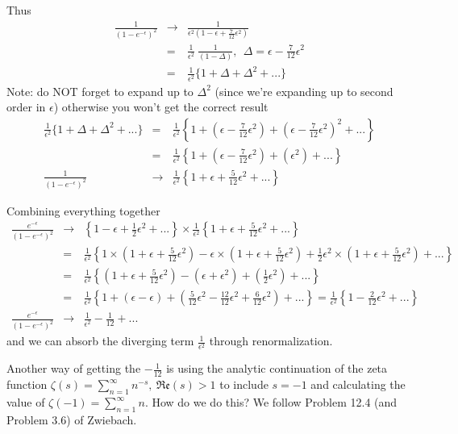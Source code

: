 \documentclass[aps,preprint,preprintnumbers,nofootinbib,showpacs,prd]{revtex4-1}
\newcommand{\nbea}{\begin{eqnarray*}}
\newcommand{\neea}{\end{eqnarray*}}
\begin{document}
Thus
%
\nbea
\frac{1}{(1-e^{-\epsilon})^2} & \rightarrow & \frac{1}{\epsilon^2(1 - \epsilon + \frac{7}{12}\epsilon^2)} \\
& = & \frac{1}{\epsilon^2} ~\frac{1}{(1 - \Delta)}, ~~\Delta = \epsilon - \frac{7}{12}\epsilon^2 \\
& = & \frac{1}{\epsilon^2} \{ 1 + \Delta + \Delta^2 + ... \}
\neea
%
Note: do NOT forget to expand up to $\Delta^2$ (since we're expanding up to second order in $\epsilon$) otherwise you won't get the correct result
%
\nbea
\frac{1}{\epsilon^2} \{ 1 + \Delta + \Delta^2 + ... \} & = & \frac{1}{\epsilon^2} \left \{ 1 + \left( \epsilon - \frac{7}{12}\epsilon^2 \right) + \left( \epsilon - \frac{7}{12}\epsilon^2 \right)^2 + ... \right \} \\
& = & \frac{1}{\epsilon^2} \left \{ 1 + \left( \epsilon - \frac{7}{12}\epsilon^2 \right) + \left( \epsilon^2 \right) + ... \right \} \\
\frac{1}{(1-e^{-\epsilon})^2} & \rightarrow & \frac{1}{\epsilon^2} \left \{ 1 + \epsilon + \frac{5}{12}\epsilon^2 + ... \right \} 
\neea
%

Combining everything together
%
\nbea
\frac{e^{-\epsilon}}{(1-e^{-\epsilon})^2} & \rightarrow & \left \{ 1 - \epsilon + \frac{1}{2} \epsilon^2 + ... \right \} \times \frac{1}{\epsilon^2} \left \{ 1 + \epsilon + \frac{5}{12}\epsilon^2 + ... \right \} \\
& = & \frac{1}{\epsilon^2} \left \{ 1 \times \left ( 1 + \epsilon + \frac{5}{12}\epsilon^2 \right ) - \epsilon \times \left ( 1 + \epsilon + \frac{5}{12}\epsilon^2 \right ) + \frac{1}{2}\epsilon^2 \times \left ( 1 + \epsilon + \frac{5}{12}\epsilon^2 \right ) + ... \right \} \\
& = & \frac{1}{\epsilon^2} \left \{ \left ( 1 + \epsilon + \frac{5}{12}\epsilon^2 \right ) - \left ( \epsilon + \epsilon^2 \right ) + \left ( \frac{1}{2}\epsilon^2 \right ) + ... \right \} \\
& = & \frac{1}{\epsilon^2} \left \{ 1 + \left ( \epsilon - \epsilon \right ) + \left ( \frac{5}{12}\epsilon^2 - \frac{12}{12}\epsilon^2 + \frac{6}{12}\epsilon^2 \right ) + ... \right \} = \frac{1}{\epsilon^2} \left \{ 1 - \frac{2}{12}\epsilon^2  + ... \right \} \\
\frac{e^{-\epsilon}}{(1-e^{-\epsilon})^2} & \rightarrow & \frac{1}{\epsilon^2} - \frac{1}{12} + ...
\neea
%
and we can absorb the diverging term $\frac{1}{\epsilon^2}$ through renormalization.

Another way of getting the $-\frac{1}{12}$ is using the analytic continuation of the zeta function $\zeta(s) = \sum\limits_{n=1}^{\infty} n^{-s},~\mathfrak{Re}(s) > 1$ to include $s = -1$ and calculating the value of $\zeta(-1) = \sum\limits_{n=1}^{\infty} n$. How do we do this? We follow Problem 12.4 (and Problem 3.6) of Zwiebach. 
\end{document}
